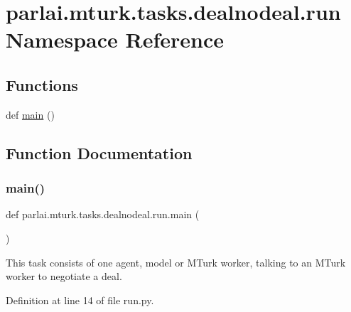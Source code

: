 \hypertarget{namespaceparlai_1_1mturk_1_1tasks_1_1dealnodeal_1_1run}{}\section{parlai.\+mturk.\+tasks.\+dealnodeal.\+run Namespace Reference}
\label{namespaceparlai_1_1mturk_1_1tasks_1_1dealnodeal_1_1run}
\subsection*{Functions}
\begin{DoxyCompactItemize}
\item 
def \hyperlink{namespaceparlai_1_1mturk_1_1tasks_1_1dealnodeal_1_1run_aafb6d1c8bf3b37bc874ee8d8dcbecce8}{main} ()
\end{DoxyCompactItemize}


\subsection{Function Documentation}
\mbox{\label{namespaceparlai_1_1mturk_1_1tasks_1_1dealnodeal_1_1run_aafb6d1c8bf3b37bc874ee8d8dcbecce8}} 
\subsubsection{\texorpdfstring{main()}{main()}}
{\footnotesize\ttfamily def parlai.\+mturk.\+tasks.\+dealnodeal.\+run.\+main (\begin{DoxyParamCaption}{ }\end{DoxyParamCaption})}

\begin{DoxyVerb}This task consists of one agent, model or MTurk worker, talking to an MTurk worker
to negotiate a deal.
\end{DoxyVerb}
 

Definition at line 14 of file run.\+py.


